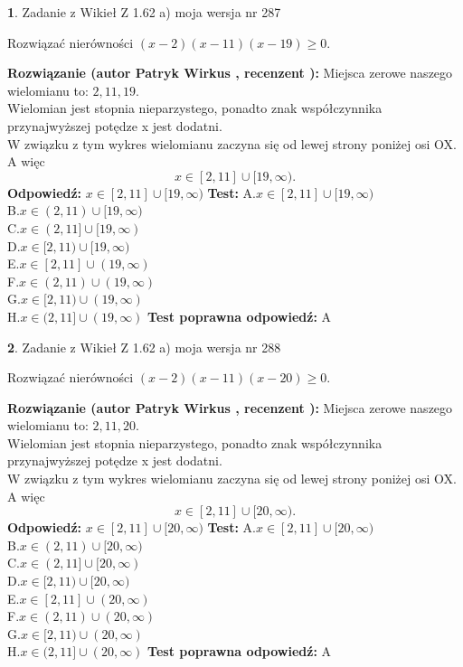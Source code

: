 \documentclass[12pt, a4paper]{article}
\theoremstyle{definition} %
\newtheorem{zad}{}
\newcommand{\zadStart}[1]{\begin{zad}#1\newline}
\newcommand{\zadStop}{\end{zad}}
\newcommand{\rozwStart}[2]{\noindent \textbf{Rozwiązanie (autor #1 , recenzent #2): }\newline}
\newcommand{\rozwStop}{\newline}
\newcommand{\odpStart}{\noindent \textbf{Odpowiedź:}\newline}
\newcommand{\odpStop}{\newline}
\newcommand{\testStart}{\noindent \textbf{Test:}\newline}
\newcommand{\testStop}{\newline}
\newcommand{\kluczStart}{\noindent \textbf{Test poprawna odpowiedź:}\newline}
\newcommand{\kluczStop}{\newline}
\begin{document}
\zadStart{Zadanie z Wikieł Z 1.62 a) moja wersja nr 287}

Rozwiązać nierówności $(x-2)(x-11)(x-19)\ge0$.
\zadStop
\rozwStart{Patryk Wirkus}{}
Miejsca zerowe naszego wielomianu to: $2, 11, 19$.\\
Wielomian jest stopnia nieparzystego, ponadto znak współczynnika przy\linebreak najwyższej potędze x jest dodatni.\\ W związku z tym wykres wielomianu zaczyna się od lewej strony poniżej osi OX. A więc $$x \in [2,11] \cup [19,\infty).$$
\rozwStop
\odpStart
$x \in [2,11] \cup [19,\infty)$
\odpStop
\testStart
A.$x \in [2,11] \cup [19,\infty)$\\
B.$x \in (2,11) \cup [19,\infty)$\\
C.$x \in (2,11] \cup [19,\infty)$\\
D.$x \in [2,11) \cup [19,\infty)$\\
E.$x \in [2,11] \cup (19,\infty)$\\
F.$x \in (2,11) \cup (19,\infty)$\\
G.$x \in [2,11) \cup (19,\infty)$\\
H.$x \in (2,11] \cup (19,\infty)$
\testStop
\kluczStart
A
\kluczStop



\zadStart{Zadanie z Wikieł Z 1.62 a) moja wersja nr 288}

Rozwiązać nierówności $(x-2)(x-11)(x-20)\ge0$.
\zadStop
\rozwStart{Patryk Wirkus}{}
Miejsca zerowe naszego wielomianu to: $2, 11, 20$.\\
Wielomian jest stopnia nieparzystego, ponadto znak współczynnika przy\linebreak najwyższej potędze x jest dodatni.\\ W związku z tym wykres wielomianu zaczyna się od lewej strony poniżej osi OX. A więc $$x \in [2,11] \cup [20,\infty).$$
\rozwStop
\odpStart
$x \in [2,11] \cup [20,\infty)$
\odpStop
\testStart
A.$x \in [2,11] \cup [20,\infty)$\\
B.$x \in (2,11) \cup [20,\infty)$\\
C.$x \in (2,11] \cup [20,\infty)$\\
D.$x \in [2,11) \cup [20,\infty)$\\
E.$x \in [2,11] \cup (20,\infty)$\\
F.$x \in (2,11) \cup (20,\infty)$\\
G.$x \in [2,11) \cup (20,\infty)$\\
H.$x \in (2,11] \cup (20,\infty)$
\testStop
\kluczStart
A
\kluczStop
\end{document}
